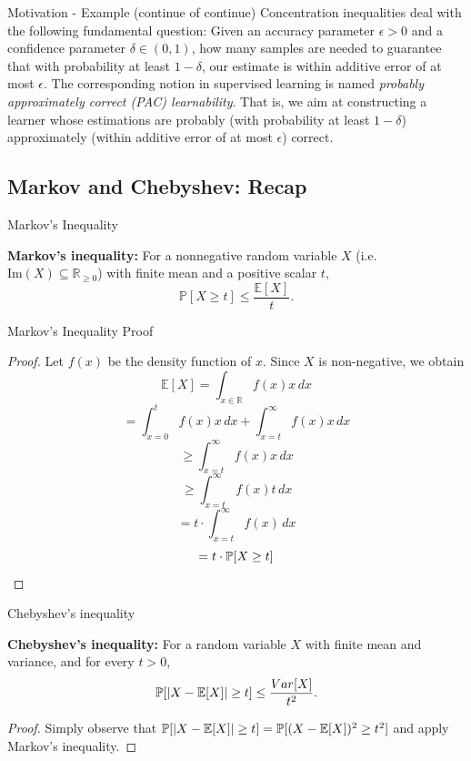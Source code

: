 \documentclass[11pt, usenames, dvipsnames]{beamer}
\begin{document}
\begin{frame}{Motivation - Example (continue of continue)}
    Concentration inequalities deal with the following fundamental question: Given an accuracy parameter $\epsilon > 0$ and a confidence parameter $\delta \in (0,1)$, how many samples are needed to guarantee that with probability at least $1- \delta$, our estimate is within additive error of at most $\epsilon$. The corresponding notion in supervised learning is named \emph{probably approximately correct (PAC)
    learnability}. That is, we aim at constructing a learner whose estimations are probably (with probability at least $1-\delta$) approximately (within additive error of at most $\epsilon$) correct.
\end{frame}
\subsection{Markov and Chebyshev: Recap}

\begin{frame}{Markov's Inequality}
\begin{theorem} \textbf{Markov's inequality:} For a nonnegative random
variable $X$ (i.e. $\text{Im}(X) \subseteq \mathbb{R}_{\ge 0}$) with finite mean and a positive scalar $t$,
$$ \mathbb{P} [X \geq t] \leq \frac{\mathbb{E}[X]}{t}. $$
\end{theorem}
\end{frame}


\begingroup
\footnotesize%

\begin{frame}{Markov's Inequality Proof}
    \begin{proof}
Let $f(x)$ be the density function of $x$. Since $X$ is non-negative, we obtain
$$\mathbb{E}[X] = \int_{x \in \mathbb{R}} f(x) x \,dx$$
\pause
$$= \int_{x = 0}^t f(x) x\, dx + \int_{x =t} ^\infty f(x) x \, dx $$
\pause
$$\ge \int_{x =t} ^\infty f(x) x \,dx $$
\pause
$$\ge \int_{x =t} ^\infty f(x) t \, dx$$
\pause
$$= t \cdot \int_{x =t} ^\infty f(x) \,dx $$
\pause
$$=t \cdot \mathbb{P}[X \ge t]$$
\end{proof}

\end{frame}
\endgroup

\begin{frame}{Chebyshev's inequality}
    \begin{theorem} \textbf{Chebyshev's inequality:} For a random variable $X$ with finite mean and variance, and for every $t  > 0$, $$\mathbb{P}[|X-\mathbb{E}[X]| \geq t] \leq \frac{Var[X]}{t^2}.$$
\end{theorem}
\pause
\begin{proof}
Simply observe that $\mathbb{P}[|X-\mathbb{E} [X]| \geq t] = \mathbb{P}[(X-\mathbb{E} [X])^2 \geq t^2]$ and apply Markov's inequality.
\end{proof}
\end{frame}
\end{document}
